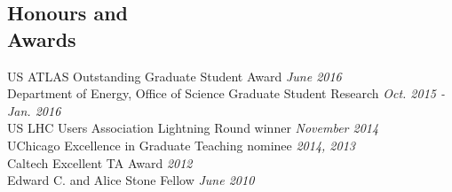 \documentclass[margin,line]{resume}
\let\origsection\section%
\let\section\subsection%
\let\section\origsection%
\begin{document}
\begin{resume}
\section{\mysidestyle Honours and\\Awards}

US ATLAS Outstanding Graduate Student Award \hfill \textsl{June 2016}\vspace{1mm}\\%
Department of Energy, Office of Science Graduate Student Research \hfill \textsl{Oct. 2015 - Jan. 2016}\vspace{1mm}\\%
US LHC Users Association Lightning Round winner \hfill \textsl{November 2014}\vspace{1mm}\\%
UChicago Excellence in Graduate Teaching nominee \hfill \textsl{2014, 2013}\vspace{1mm}\\%
Caltech Excellent TA Award \hfill \textsl{2012}\vspace{1mm}\\%
Edward C. and Alice Stone Fellow \hfill \textsl{June 2010}\vspace{1mm}\\%

\end{resume}
\end{document}
